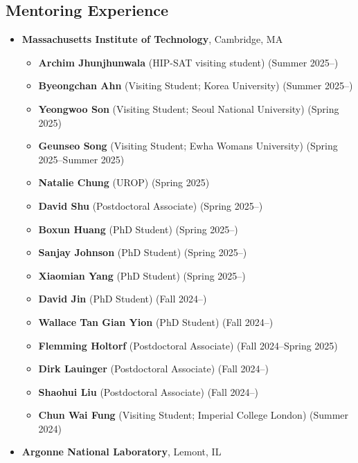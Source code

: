 \subsection*{Mentoring Experience}
\begin{itemize}[itemsep=1pt, parsep=0pt,leftmargin=*]
  \item[] \textbf{Massachusetts Institute of Technology}, Cambridge, MA
    \begin{itemize}[itemsep=1pt, parsep=0pt,leftmargin=*]
    \item[] \textbf{Archim Jhunjhunwala} (HIP-SAT visiting student) \hfill (Summer 2025--)
    \item[] \textbf{Byeongchan Ahn} (Visiting Student; Korea University) \hfill (Summer 2025--)
    \item[] \textbf{Yeongwoo Son} (Visiting Student; Seoul National University) \hfill (Spring 2025)
    \item[] \textbf{Geunseo Song} (Visiting Student; Ewha Womans University) \hfill (Spring 2025--Summer 2025)
    \item[] \textbf{Natalie Chung} (UROP) \hfill (Spring 2025)
    \item[] \textbf{David Shu} (Postdoctoral Associate) \hfill (Spring 2025--)
    \item[] \textbf{Boxun Huang} (PhD Student) \hfill (Spring 2025--)
    \item[] \textbf{Sanjay Johnson} (PhD Student) \hfill (Spring 2025--)
    \item[] \textbf{Xiaomian Yang} (PhD Student) \hfill (Spring 2025--)
    \item[] \textbf{David Jin} (PhD Student) \hfill (Fall 2024--)
    \item[] \textbf{Wallace Tan Gian Yion} (PhD Student) \hfill (Fall 2024--)
    \item[] \textbf{Flemming Holtorf} (Postdoctoral Associate) \hfill (Fall 2024--Spring 2025)
    \item[] \textbf{Dirk Lauinger} (Postdoctoral Associate) \hfill (Fall 2024--)
    \item[] \textbf{Shaohui Liu} (Postdoctoral Associate) \hfill (Fall 2024--)
    \item[] \textbf{Chun Wai Fung} (Visiting Student; Imperial College London) \hfill (Summer 2024)
  \end{itemize}
\item[] \textbf{Argonne National Laboratory}, Lemont, IL
  \begin{itemize}[itemsep=1pt, parsep=0pt,leftmargin=*]

\end{itemize}
\end{itemize}
